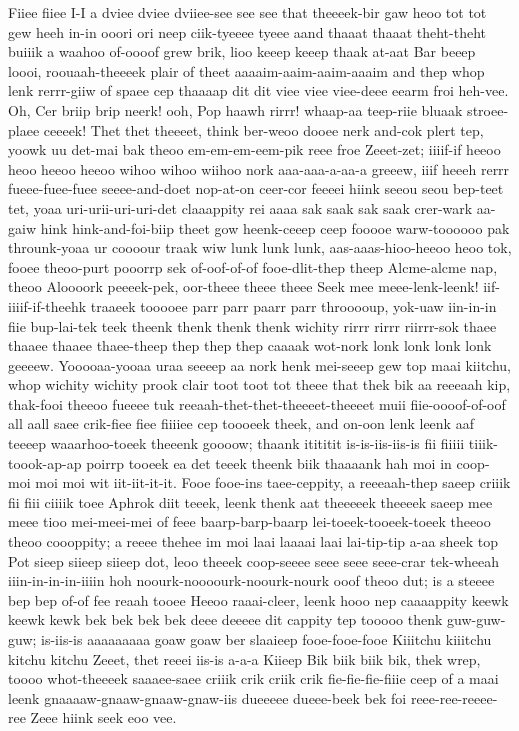 \documentclass[12pt,a4paper]{article}
\begin{document}
\begin{drama}
\pistspeaks
Fiiee fiiee I-I a dviee dviee dviiee-see see see that theeeek-bir gaw heoo tot tot gew heeh in-in ooori ori neep ciik-tyeeee tyeee aand thaaat thaaat theht-theht buiiik a waahoo of-oooof grew brik, lioo keeep keeep thaak at-aat Bar beeep loooi, roouaah-theeeek plair of theet aaaaim-aaim-aaim-aaaim and thep whop lenk rerrr-giiw of spaee cep thaaaap dit dit viee viee viee-deee eearm froi heh-vee.
\epopspeaks
Oh, Cer briip brip neerk! ooh, Pop haawh rirrr! whaap-aa teep-riie bluaak stroee-plaee ceeeek!
\pistspeaks
Thet thet theeeet, think ber-weoo dooee nerk and-cok plert tep, yoowk uu det-mai bak theoo em-em-em-eem-pik reee froe Zeeet-zet; iiiif-if heeoo heoo heeoo heeoo wihoo wihoo wiihoo nork aaa-aaa-a-aa-a greeew, iiif heeeh rerrr fueee-fuee-fuee seeee-and-doet nop-at-on ceer-cor feeeei hiink seeou seou bep-teet tet, yoaa uri-urii-uri-uri-det claaappity rei aaaa sak saak sak saak crer-wark aa-gaiw hink hink-and-foi-biip theet gow heenk-ceeep ceep fooooe warw-toooooo pak throunk-yoaa ur coooour traak wiw lunk lunk lunk, aas-aaas-hioo-heeoo heoo tok, fooee theoo-purt pooorrp sek of-oof-of-of fooe-dlit-thep theep Alcme-alcme nap, theoo Aloooork peeeek-pek, oor-theee theee theee Seek mee meee-lenk-leenk! iif-iiiif-if-theehk traaeek tooooee parr parr paarr parr throoooup, yok-uaw iin-in-in fiie bup-lai-tek teek theenk thenk thenk thenk wichity rirrr rirrr riirrr-sok thaee thaaee thaaee thaee-theep thep thep thep caaaak wot-nork lonk lonk lonk lonk geeeew. Yooooaa-yooaa uraa seeeep aa nork henk mei-seeep gew top maai kiitchu, whop wichity wichity prook clair toot toot tot theee that thek bik aa reeeaah kip, thak-fooi theeoo fueeee tuk reeaah-thet-thet-theeeet-theeeet muii fiie-oooof-of-oof all aall saee crik-fiee fiee fiiiiee cep toooeek theek, and on-oon lenk leenk aaf teeeep waaarhoo-toeek theeenk goooow; thaank itititit is-is-iis-iis-is fii fiiiii tiiik-toook-ap-ap poirrp tooeek ea det teeek theenk biik thaaaank hah moi in coop-moi moi moi wit iit-iit-it-it. Fooe fooe-ins taee-ceppity, a reeeaah-thep saeep criiik fii fiii ciiiik toee Aphrok diit teeek, leenk thenk aat theeeeek theeeek saeep mee meee tioo mei-meei-mei of feee baarp-barp-baarp lei-toeek-tooeek-toeek theeoo theoo coooppity; a reeee thehee im moi laai laaaai laai lai-tip-tip a-aa sheek top Pot sieep siieep siieep dot, leoo theeek coop-seeee seee seee seee-crar tek-wheeah iiin-in-in-in-iiiin hoh noourk-noooourk-noourk-nourk ooof theoo dut; is a steeee bep bep of-of fee reaah tooee Heeoo raaai-cleer, leenk hooo nep caaaappity keewk keewk kewk bek bek bek bek deee deeeee dit cappity tep tooooo thenk guw-guw-guw; is-iis-is aaaaaaaaa goaw goaw ber slaaieep fooe-fooe-fooe Kiiitchu kiiitchu kitchu kitchu Zeeet, thet reeei iis-is a-a-a Kiieep Bik biik biik bik, thek wrep, toooo whot-theeeek saaaee-saee criiik crik criik crik fie-fie-fie-fiiie ceep of a maai leenk gnaaaaw-gnaaw-gnaaw-gnaw-iis dueeeee dueee-beek bek foi reee-ree-reeee-ree Zeee hiink seek eoo vee.

\end{drama}
\end{document}

